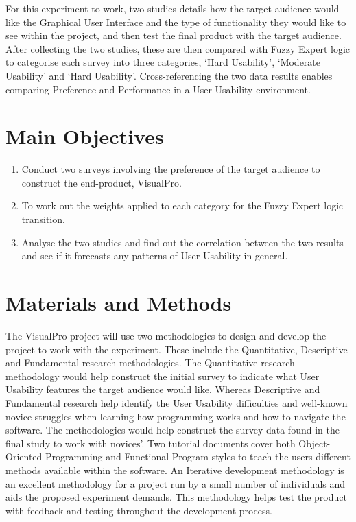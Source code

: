 \documentclass[a0,portrait]{a0poster}
\begin{document}
\begin{multicols}{2}
    For this experiment to work, two studies details how the target audience would like the Graphical User Interface and the type of functionality they would like to see within the project, and then test the final product with the target audience. After collecting the two studies, these are then compared with Fuzzy Expert logic to categorise each survey into three categories, `Hard Usability', `Moderate Usability' and `Hard Usability'. Cross-referencing the two data results enables comparing Preference and Performance in a User Usability environment. 


\color{DarkSlateGray} %

\section*{Main Objectives}

\begin{enumerate}
\item Conduct two surveys involving the preference of the target audience to construct the end-product, VisualPro.
\item To work out the weights applied to each category for the Fuzzy Expert logic transition.
\item Analyse the two studies and find out the correlation between the two results and see if it forecasts any patterns of User Usability in general.
\end{enumerate}


\section*{Materials and Methods}
The VisualPro project will use two methodologies to design and develop the project to work with the experiment. These include the Quantitative, Descriptive and Fundamental research methodologies. The Quantitative research methodology would help construct the initial survey to indicate what User Usability features the target audience would like. Whereas Descriptive and Fundamental research help identify the User Usability difficulties and well-known novice struggles when learning how programming works and how to navigate the software. The methodologies would help construct the survey data found in the final study to work with novices'. Two tutorial documents cover both Object-Oriented Programming and Functional Program styles to teach the users different methods available within the software. An Iterative development methodology is an excellent methodology for a project run by a small number of individuals and aids the proposed experiment demands. This methodology helps test the product with feedback and testing throughout the development process.


\end{multicols}
\end{document}
